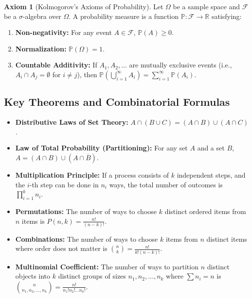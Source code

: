 \documentclass[11pt, letterpaper]{article}
\theoremstyle{definition}
\newtheorem{axiom}{Axiom}[section]
\theoremstyle{remark}
\newcommand{\comp}[1]{\overline{#1}}
\begin{document}
\begin{axiom}[Kolmogorov's Axioms of Probability]
Let $\Omega$ be a sample space and $\mathscr{F}$ be a $\sigma$-algebra over $\Omega$. A probability measure is a function $\mathbb{P}: \mathscr{F} \to \mathbb{R}$ satisfying:
\begin{enumerate}
    \item \textbf{Non-negativity:} For any event $A \in \mathscr{F}$, $\mathbb{P}(A) \ge 0$.
    \item \textbf{Normalization:} $\mathbb{P}(\Omega) = 1$.
    \item \textbf{Countable Additivity:} If $A_{1}, A_{2}, \dots$ are mutually exclusive events (i.e., $A_{i} \cap A_{j} = \emptyset$ for $i \ne j$), then $\mathbb{P}\left(\bigcup_{i=1}^{\infty} A_{i}\right) = \sum_{i=1}^{\infty} \mathbb{P}(A_{i})$.
\end{enumerate}
\end{axiom}

\subsection{Key Theorems and Combinatorial Formulas}
\begin{itemize}
    \item \textbf{Distributive Laws of Set Theory:} $A \cap (B \cup C) = (A \cap B) \cup (A \cap C)$.
    \item \textbf{Law of Total Probability (Partitioning):} For any set $A$ and a set $B$, $A = (A \cap B) \cup (A \cap \comp{B})$.
    \item \textbf{Multiplication Principle:} If a process consists of $k$ independent steps, and the $i$-th step can be done in $n_{i}$ ways, the total number of outcomes is $\prod_{i=1}^{k} n_{i}$.
    \item \textbf{Permutations:} The number of ways to choose $k$ distinct ordered items from $n$ items is $P(n, k) = \frac{n!}{(n-k)!}$.
    \item \textbf{Combinations:} The number of ways to choose $k$ items from $n$ distinct items where order does not matter is $\binom{n}{k} = \frac{n!}{k!(n-k)!}$.
    \item \textbf{Multinomial Coefficient:} The number of ways to partition $n$ distinct objects into $k$ distinct groups of sizes $n_{1}, n_{2}, \dots, n_{k}$ where $\sum n_{i} = n$ is $\binom{n}{n_{1}, n_{2}, \dots, n_{k}} = \frac{n!}{n_{1}!n_{2}!\dots n_{k}!}$.
\end{itemize}
\end{document}
